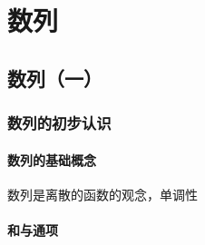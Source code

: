 \part{数列}
\chapter{数列（一）}

\section{数列的初步认识}
\subsection{数列的基础概念}
数列是离散的函数的观念，单调性
\clearpage
\subsection{和与通项}
\clearpage
